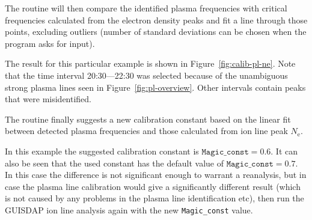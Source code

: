 \documentclass[a4]{article}
\begin{document}
The routine will then compare the identified plasma frequencies with
critical frequencies calculated from the electron density peaks and
fit a line through those points, excluding outliers (number of
standard deviations can be chosen when the program asks for
input).

The result for this particular example is shown in
Figure~\ref{fig:calib-pl-ne}. Note that the time interval
20:30---22:30 was selected because of the unambiguous strong plasma
lines seen in Figure~\ref{fig:pl-overview}. Other intervals contain
peaks that were misidentified.

The routine finally suggests a new calibration constant based on the
linear fit between detected plasma frequencies and those calculated
from ion line peak $N_\mathrm{e}$.

In this example the suggested calibration constant is
$\mathtt{Magic\_const}=0.6$. It can also be seen that the used
constant has the default value of $\mathtt{Magic\_const}=0.7$. In this
case the difference is not significant enough to warrant a reanalysis, but in case the plasma line calibration would give a significantly different result (which is not caused by any problems in the plasma line identification etc), then run the GUISDAP ion line analysis again with the new \texttt{Magic\_const} value.
\end{document}
